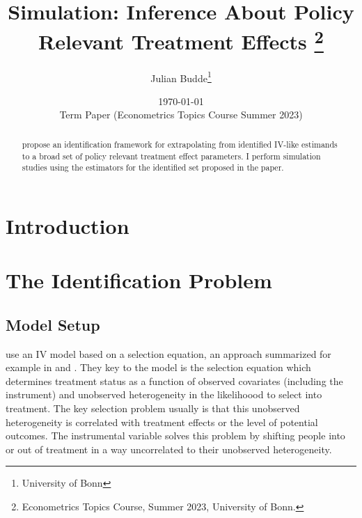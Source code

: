 \documentclass[11pt, a4paper, leqno]{article}
\begin{document}
\title{Simulation: Inference About Policy Relevant Treatment Effects \thanks{Econometrics Topics Course, Summer 2023, University of Bonn.}}

\author{Julian Budde\thanks{University of Bonn}}

\date{\today \\ \vspace{1em} Term Paper (Econometrics Topics Course Summer 2023)}
\maketitle


\begin{abstract}
\citet{mogstad2018using} propose an identification framework for extrapolating from identified IV-like estimands to a broad set of policy relevant treatment effect parameters.
I perform simulation studies using the estimators for the identified set proposed in the paper.
\end{abstract}

\clearpage
\pagebreak

\tableofcontents
\clearpage
\newpage
\section{Introduction}

\section{The Identification Problem}
\subsection{Model Setup}
\citet{mogstad2018using} use an IV model based on a selection equation, an approach summarized for example in \citet{heckman2007econometric1} and \citet{heckman2007econometric2}.
They key to the model is the selection equation which determines treatment status as a function of observed covariates (including the instrument) and unobserved heterogeneity in the likelihoood to select into treatment.
The key selection problem usually is that this unobserved heterogeneity is correlated with treatment effects or the level of potential outcomes.
The instrumental variable solves this problem by shifting people into or out of treatment in a way uncorrelated to their unobserved heterogeneity.
\end{document}
